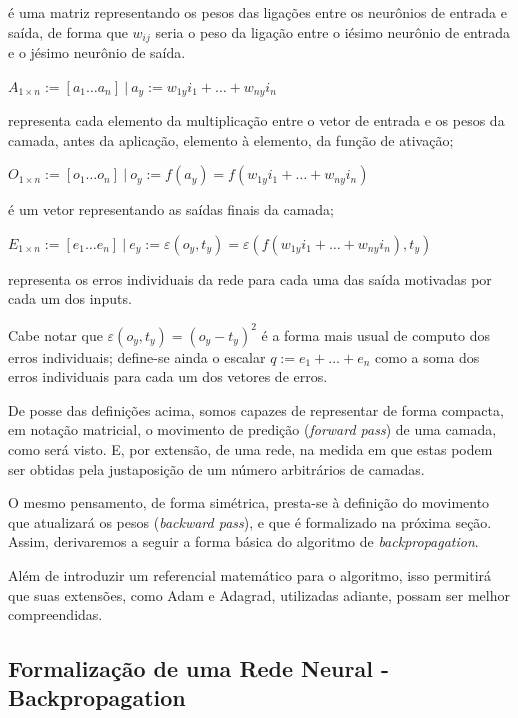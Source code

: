 \documentclass[]{article}
\begin{document}
é uma matriz representando os pesos das ligações entre os neurônios de
entrada e saída, de forma que \(w_{ij}\) seria o peso da ligação entre o
iésimo neurônio de entrada e o jésimo neurônio de saída.

\(A_{1 \times n} := [a_1 \dots a_n] \ |\
a_y := w_{1y}i_1 + \dots + w_{ny}i_n\)

representa cada elemento da multiplicação entre o vetor de entrada e os
pesos da camada, antes da aplicação, elemento à elemento, da função de
ativação;

\(O_{1 \times n} := [o_1 \dots o_n] \ |\
o_y := f(a_y) = f(w_{1y}i_1 + \dots + w_{ny}i_n)\)

é um vetor representando as saídas finais da camada;

\(E_{1 \times n} := [e_1 \dots e_n] \ |\
e_y := \varepsilon (o_y, t_y) = \varepsilon (f(w_{1y}i_1 + \dots + w_{ny}i_n) , t_y)\)

representa os erros individuais da rede para cada uma das saída
motivadas por cada um dos inputs.

Cabe notar que \(\varepsilon (o_y, t_y) = (o_y - t_y)^2\) é a forma mais
usual de computo dos erros individuais; define-se ainda o escalar
\(q := e_1 + \dots + e_n\) como a soma dos erros individuais para cada
um dos vetores de erros.

De posse das definições acima, somos capazes de representar de forma
compacta, em notação matricial, o movimento de predição (\emph{forward
pass}) de uma camada, como será visto. E, por extensão, de uma rede, na
medida em que estas podem ser obtidas pela justaposição de um número
arbitrários de camadas.

O mesmo pensamento, de forma simétrica, presta-se à definição do
movimento que atualizará os pesos (\emph{backward pass}), e que é
formalizado na próxima seção. Assim, derivaremos a seguir a forma básica
do algoritmo de \emph{backpropagation}.

Além de introduzir um referencial matemático para o algoritmo, isso
permitirá que suas extensões, como Adam e Adagrad, utilizadas adiante,
possam ser melhor compreendidas.

\hypertarget{formalizauxe7uxe3o-de-uma-rede-neural---backpropagation}{%
\subsection{Formalização de uma Rede Neural -
Backpropagation}\label{formalizauxe7uxe3o-de-uma-rede-neural---backpropagation}}
\end{document}
